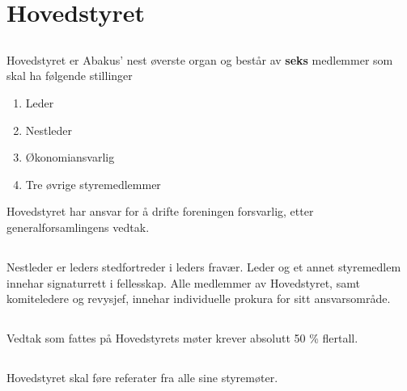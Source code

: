 \section{Hovedstyret}

\subsection{}
Hovedstyret er Abakus’ nest øverste organ og består av \textbf{seks} medlemmer som skal ha følgende stillinger 

\begin{enumerate}[label=\alph*)]
    \item Leder
    \item Nestleder
    \item Økonomiansvarlig
    \item Tre øvrige styremedlemmer
\end{enumerate}
Hovedstyret har ansvar for å drifte foreningen forsvarlig, etter generalforsamlingens vedtak.
\subsection{}
Nestleder er leders stedfortreder i leders fravær. Leder og et annet styremedlem innehar signaturrett i fellesskap. 
Alle medlemmer av Hovedstyret, samt komiteledere og revysjef, innehar individuelle prokura for sitt ansvarsområde. 

\subsection{}
Vedtak som fattes på Hovedstyrets møter krever absolutt 50 \% flertall.

\subsection{}
Hovedstyret skal føre referater fra alle sine styremøter. 
